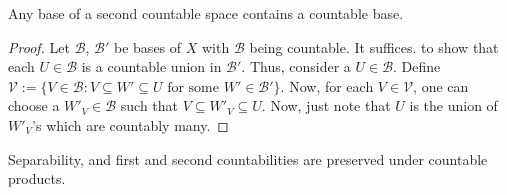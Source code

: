 	\begin{prp}
		Any base of a second countable space contains a countable base.
	\end{prp}
	
	\begin{proof}
		Let $\mathscr B$, $\mathscr B'$ be bases of $X$ with $\mathscr B$ being countable. It suffices.
		to show that each $U\in\mathscr B$ is a countable union in $\mathscr B'$. Thus, consider a $U\in\mathscr B$.
		Define $\mathscr V:= \{V\in\mathscr B : V\subseteq W'\subseteq U \text{ for some } W'\in\mathscr B'\}$. Now, for each $V\in\mathscr V$, one can choose
		a $W'_V\in\mathscr B$ such that $V\subseteq W'_V\subseteq U$. Now, just note that $U$ is the union of $W'_V$'s which are countably many.
	\end{proof}
	
	
	\begin{prp}
		Separability, and first and second countabilities are preserved under countable products.
	\end{prp}
	
